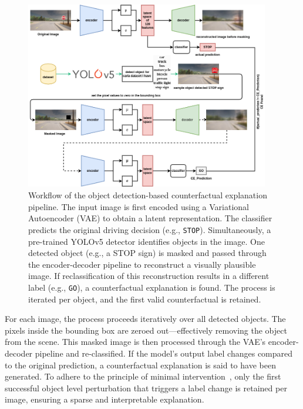 \begin{figure}[htbp]
    \centering
    \includegraphics[width=0.95\textwidth]{img/masking/object_detection/object_detection_based_masking_flow.drawio.png}
    \caption[Workflow of object detection-based counterfactual generation]{%
    Workflow of the object detection-based counterfactual explanation pipeline. The input image is first encoded using a Variational Autoencoder (VAE) to obtain a latent representation. The classifier predicts the original driving decision (e.g., \texttt{STOP}). Simultaneously, a pre-trained YOLOv5 detector identifies objects in the image. One detected object (e.g., a STOP sign) is masked and passed through the encoder-decoder pipeline to reconstruct a visually plausible image. If reclassification of this reconstruction results in a different label (e.g., \texttt{GO}), a counterfactual explanation is found. The process is iterated per object, and the first valid counterfactual is retained.}
    \label{fig:object_detection_workflow}
\end{figure}

For each image, the process proceeds iteratively over all detected objects. The pixels inside the bounding box are zeroed out—effectively removing the object from the scene. This masked image is then processed through the VAE's encoder-decoder pipeline and re-classified. If the model's output label changes compared to the original prediction, a counterfactual explanation is said to have been generated. To adhere to the principle of minimal intervention~\cite{wachter2018CE}, only the first successful object level perturbation that triggers a label change is retained per image, ensuring a sparse and interpretable explanation.

